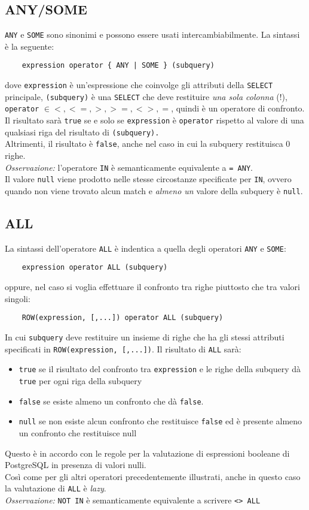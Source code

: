 \documentclass[12pt,a4paper]{book}
\begin{document}
	\subsection{ANY/SOME}
	\texttt{ANY} e \texttt{SOME} sono sinonimi e possono essere usati intercambiabilmente. La sintassi è la seguente:
	\begin{lstlisting}
	expression operator { ANY | SOME } (subquery)	
	\end{lstlisting}
	dove \texttt{expression} è un'espressione che coinvolge gli attributi della \texttt{SELECT} principale, \texttt{(subquery)} è una \texttt{SELECT} che deve restituire \textit{una sola colonna} (!), \texttt{operator} $\in {<,<=, >, >=, <>, =}$, quindi è un operatore di confronto.\\
	Il risultato sarà \texttt{true} se e solo se \texttt{expression} è \texttt{operator} rispetto al valore di una qualsiasi riga del risultato di \texttt{(subquery).}\\
	Altrimenti, il risultato è \texttt{false}, anche nel caso in cui la subquery restituisca 0 righe.\\
	\textit{Osservazione:} l'operatore \texttt{IN} è semanticamente equivalente a \texttt{= ANY}.\\
	Il valore \texttt{null} viene prodotto nelle stesse circostanze specificate per \texttt{IN}, ovvero quando non viene trovato alcun match e \textit{almeno un} valore della subquery è \texttt{null}.
	\subsection{ALL}
	La sintassi dell'operatore \texttt{ALL} è indentica a quella degli operatori \texttt{ANY} e \texttt{SOME}:
	\begin{lstlisting}
	expression operator ALL (subquery)
	\end{lstlisting}
	oppure, nel caso si voglia effettuare il confronto tra righe piuttosto che tra valori singoli:
	\begin{lstlisting}
	ROW(expression, [,...]) operator ALL (subquery)
	\end{lstlisting}
	In cui \texttt{subquery} deve restituire un insieme di righe che ha gli stessi attributi specificati in \texttt{ROW(expression, [,...])}.
	Il risultato di \texttt{ALL} sarà:
	\begin{itemize}
		\item \texttt{true} se il risultato del confronto tra \texttt{expression} e le righe della subquery dà \texttt{true} per ogni riga della subquery
		\item \texttt{false} se esiste almeno un confronto che dà \texttt{false}.
		\item \texttt{null} se non esiste alcun confronto che restituisce \texttt{false} ed è presente almeno un confronto che restituisce null
	\end{itemize}
	Questo è in accordo con le regole per la valutazione di espressioni booleane di PostgreSQL in presenza di valori nulli.\\Così come per gli altri operatori precedentemente illustrati, anche in questo caso la valutazione di \texttt{ALL} è \textit{lazy}.\\
	\textit{Osservazione:} \texttt{NOT IN} è semanticamente equivalente a scrivere \texttt{<> ALL} 
\end{document}

